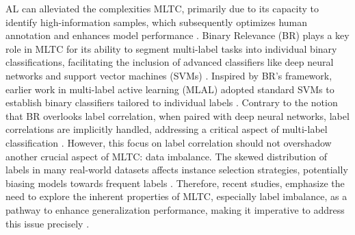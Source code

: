 \documentclass[letterpaper]{article} %
\begin{document}
AL can alleviated the complexities MLTC, primarily due to its capacity to identify high-information samples, which subsequently optimizes human annotation and enhances model performance \citep{REYES2018494, 10.1145/3379504}.
Binary Relevance (BR) plays a key role in MLTC for its ability to segment multi-label tasks into individual binary classifications, facilitating the inclusion of advanced classifiers like deep neural networks and support vector machines (SVMs) \cite{Zhang2018}.
Inspired by BR's framework, earlier work in multi-label active learning (MLAL) adopted standard SVMs to establish binary classifiers tailored to individual labels \cite{mmc2009, adaptive2013, Cherman2019}.
Contrary to the notion that BR overlooks label correlation, when paired with deep neural networks, label correlations are implicitly handled, addressing a critical aspect of multi-label classification \cite{Su2021}.
However, this focus on label correlation should not overshadow another crucial aspect of MLTC: data imbalance. The skewed distribution of labels in many real-world datasets affects instance selection strategies, potentially biasing models towards frequent labels \cite{Wu_Lyu_Ghanem_2016}.
Therefore, recent studies, emphasize the need to explore the inherent properties of MLTC, especially label imbalance, as a pathway to enhance generalization performance, making it imperative to address this issue
 precisely \cite{Zhang2018}.
\end{document}
